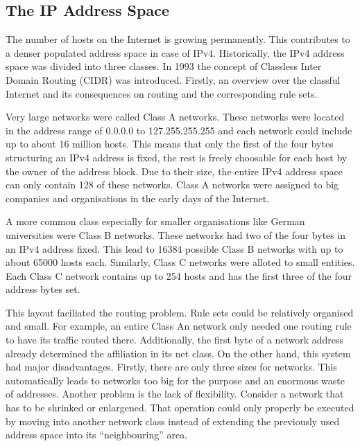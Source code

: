 \documentclass[a4paper,
		12pt,
		parskip=full,
		titlepage
		]{scrartcl}
\begin{document}
\subsection{The IP Address Space}
The number of hosts on the Internet is growing permanently.
This contributes to a denser populated address space in case of IPv4.
Historically, the IPv4 address space was divided into three classes\cite{rfc1466}.
In 1993 the concept of Classless Inter Domain Routing (CIDR) was introduced.
Firstly, an overview over the classful Internet and its consequences on routing and the corresponding rule sets.

Very large networks were called Class A networks.
These networks were located in the address range of 0.0.0.0 to 127.255.255.255 and each network could include up to about 16 million hosts.
This means that only the first of the four bytes structuring an IPv4 address is fixed, the rest is freely choosable for each host by the owner of the address block.
Due to their size, the entire IPv4 address space can only contain 128 of these networks.
Class A networks were assigned to big companies and organisations in the early days of the Internet.

A more common class especially for smaller organisations like German universities were Class B networks.
These networks had two of the four bytes in an IPv4 address fixed.
This lead to 16384 possible Class B networks with up to about 65000 hosts each.
Similarly, Class C networks were alloted to small entities.
Each Class C network contains up to 254 hosts and has the first three of the four address bytes set.

This layout faciliated the routing problem.
Rule sets could be relatively organised and small.
For example, an entire Class An network only needed one routing rule to have its traffic routed there.
Additionally, the first byte of a network address already determined the affiliation in its net class.
On the other hand, this system had major disadvantages.
Firstly, there are only three sizes for networks.
This automatically leads to networks too big for the purpose and an enormous waste of addresses.
Another problem is the lack of flexibility.
Consider a network that has to be shrinked or enlargened.
That operation could only properly be executed by moving into another network class instead of extending the 
previously used address space into its \enquote{neighbouring} area.
\end{document}
